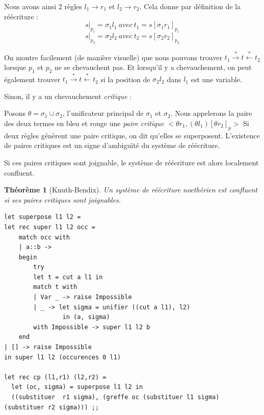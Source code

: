 \documentclass[11pt]{book}
\newtheorem{theoreme}{Théorème}
\begin{document}
Nous avons ainsi 2 règles $l_1 \rightarrow r_1$ et $l_2 \rightarrow r_2$. Cela donne par définition de la réécriture :
$$ s|_{p_1} = \sigma_1 l_1\ avec\ t_1=s[\sigma_1 r_1]_{p_1} $$
$$ s|_{p_2} = \sigma_2 l_2\ avec\ t_2=s[\sigma_2 r_2]_{p_2} $$

On montre facilement (de manière visuelle) que nous pouvons trouver 
$t_1 \overset{*}{\rightarrow} t \overset{*}{\leftarrow} t_2$ lorsque
$p_1$ et $p_2$ ne se chevauchent pas. Et lorsqu'il y a chevauchement, on peut également trouver 
$t_1 \overset{*}{\rightarrow} t \overset{*}{\leftarrow} t_2$ si la position de $\sigma_2 l_2$ dans $l_1$ 
 est une variable.

\vspace{0.2cm}
Sinon, il y a un chevauchement \textit{critique} :
\begin{center}
	\end{center}

	Posons $\theta =  \sigma_1 \cup \sigma_2$, l'unificateur principal de $\sigma_1$ et $\sigma_2$.
	Nous appelerons la paire des deux termes en bleu et rouge
	 une \textit{paire critique} $<\theta r_1, (\theta l_1)[\theta r_2]_p > $
	 Si deux règles génèrent une paire critique, on dit qu'elles se superposent.
     L'existence de paires critiques est un signe d'ambiguïté du système de réécriture.

	 Si ces paires critiques sont joignable, le système de réécriture est alors localement confluent.
	 \begin{theoreme}[Knuth-Bendix]
		  Un système de réécriture noethérien est confluent si ses paires critiques sont joignables.
	\end{theoreme}
\begin{Verbatim}
let superpose l1 l2 =
let rec super l1 l2 occ =
	match occ with
	| a::b -> 
	begin
		try 
		let t = cut a l1 in
		match t with 
		| Var _ -> raise Impossible
		| _ -> let sigma = unifier ((cut a l1), l2)
				in (a, sigma)
		with Impossible -> super l1 l2 b 
	end
| [] -> raise Impossible
in super l1 l2 (occurences 0 l1)

let rec cp (l1,r1) (l2,r2) =
  let (oc, sigma) = superpose l1 l2 in
  ((substituer  r1 sigma), (greffe oc (substituer l1 sigma) (substituer r2 sigma))) ;;  
\end{Verbatim}
\end{document}
